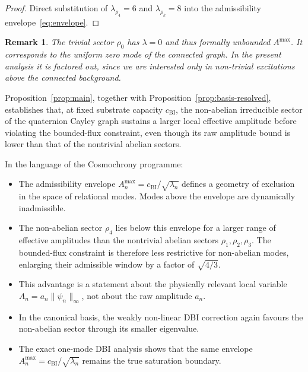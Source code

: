 \documentclass[11pt,a4paper]{article}
\newtheorem{remark}{Remark}
\begin{document}
  \begin{proof}
    Direct substitution of $\lambda_{\rho_4} = 6$ and $\lambda_{\rho_k} = 8$
    into the admissibility envelope~\eqref{eq:envelope}.
  \end{proof}

  \begin{remark}
    The trivial sector $\rho_0$ has $\lambda = 0$ and thus formally unbounded $A^{\max}$.
    It corresponds to the uniform zero mode of the connected graph.
    In the present analysis it is factored out, since we are interested only in
    non-trivial excitations above the connected background.
  \end{remark}

  Proposition~\ref{prop:main}, together with
  Proposition~\ref{prop:basis-resolved}, establishes that, at fixed substrate capacity
  $c_{\mathrm{BI}}$, the non-abelian irreducible sector of the quaternion Cayley graph sustains
  a larger local effective amplitude before violating the bounded-flux constraint,
  even though its raw amplitude bound is lower than that of the nontrivial abelian
  sectors.

  In the language of the Cosmochrony programme:
  \begin{itemize}
    \item The admissibility envelope $A_n^{\max} = c_{\mathrm{BI}} / \sqrt{\lambda_n}$ defines a
    geometry of exclusion in the space of relational modes.
    Modes above the envelope are dynamically inadmissible.
    \item The non-abelian sector $\rho_4$ lies below this envelope for a larger
    range of effective amplitudes than the nontrivial abelian sectors
    $\rho_1, \rho_2, \rho_3$.
    The bounded-flux constraint is therefore less restrictive for non-abelian modes,
    enlarging their admissible window by a factor of $\sqrt{4/3}$.
    \item This advantage is a statement about the physically relevant local variable
    $A_n = a_n \|\psi_n\|_\infty$, not about the raw amplitude $a_n$.
    \item In the canonical basis, the weakly non-linear DBI correction again favours
    the non-abelian sector through its smaller eigenvalue.
    \item The exact one-mode DBI analysis shows that the same envelope
    $A_n^{\max} = c_{\mathrm{BI}}/\sqrt{\lambda_n}$ remains the true saturation boundary.
  \end{itemize}
\end{document}
